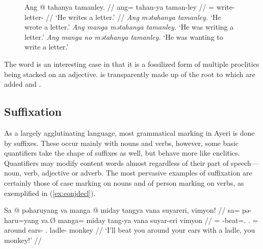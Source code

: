 \begin{figure}
\pex\label{ex:topclt}
	\a\begingl
		\gla Ang @ tahanya tamanley. //
		\glb ang= tahan-ya taman-ley //
		\glc \AgtT{}= write-\TsgM{} letter-\PargI{} //
		\glft `He writes a letter.' //
	\endgl
	\a \textit{Ang mətahanya tamanley.} `He wrote a letter.'
	\a \textit{Ang manga mətahanya tamanley.} `He was writing a letter.'
	\a \textit{Ang manga no mətahanya tamanley.} `He was wanting to write a 
		letter.'
\xe
\end{figure}

The word  is an
interesting case in that it is a fossilized form of multiple proclitics being
stacked on an adjective.  is transparently made up
of the root  to which are added
 and .


\subsection{Suffixation}

As a largely agglutinating language, most grammatical marking in Ayeri is done by 
suffixes. These occur mainly with nouns and verbs,
however, some basic quantifiers take the shape of suffixes as well, but behave
more like enclitics. Quantifiers may modify content words almost regardless of
their part of speech---noun, verb, adjective or adverb. The most pervasive
examples of suffixation are certainly those of case marking on nouns and of
person marking on verbs, as exemplified in (\ref{ex:conjdecl}).

\ex\label{ex:conjdecl}\begingl
	\gla Sa @ pəharuyang va manga @ miday tangya vana suyareri, vimyon! //
	\glb sa= pə-haru=yang va.Ø manga= miday tang-ya vana suyar-eri vimyon //
	\glc \PatT{}= \NFut{}-beat=\Fsg{}.\Aarg{} \Ssg{}.\Top{} \Dir{}= around 
		ears-\Loc{} \Ssg{}.\Gen{} ladle-\Ins{} monkey //
	\glft `I'll beat you around your ears with a ladle, you monkey!' //
\endgl\xe

